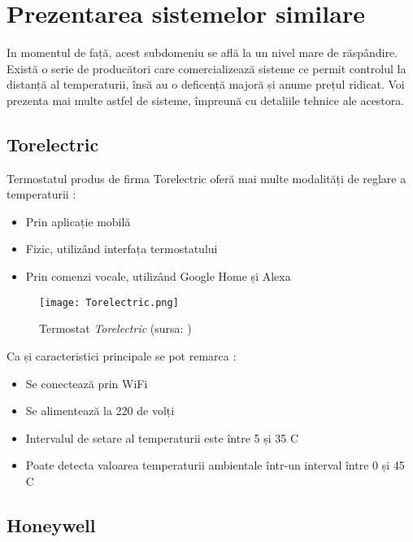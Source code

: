 \chapter{Prezentarea sistemelor similare}\label{ch:2sistemeSimilare}

	In momentul de față, acest subdomeniu se află la un nivel mare de răspândire. Există o serie de producători care comercializează sisteme ce permit controlul la distanță al temperaturii, însă au o deficență majoră și anume prețul ridicat. Voi prezenta mai multe astfel de sisteme, împreună cu detaliile tehnice ale acestora. 	

\section{Torelectric}
	Termostatul produs de firma Torelectric oferă mai multe modalități de reglare a temperaturii \cite{torelectric}:
	\begin{itemize}
  	\setlength{\itemindent}{2em}
		\itemsep0em
		\item Prin aplicație mobilă
		\item Fizic, utilizând interfața termostatului
		\item Prin comenzi vocale, utilizând Google Home și Alexa
	\end{itemize}
	

	\begin{figure}[H]
    		\centering
    		\texttt{[image: Torelectric.png]}
		\caption{Termostat \textit{Torelectric} (sursa: \cite{torelectric})}
	\end{figure}

\vspace{2em}

	Ca și caracteristici principale se pot remarca \cite{torelectric}:
	\begin{itemize}
	\setlength{\itemindent}{2em}
		\itemsep0em
		\item Se conectează prin WiFi
		\item Se alimentează la 220 de volți
		\item Intervalul de setare al temperaturii este între 5 și 35 \textdegree{}C
		\item Poate detecta valoarea temperaturii ambientale într-un interval între 0 și 45 \textdegree{}C
	\end{itemize}

\section{Honeywell}

